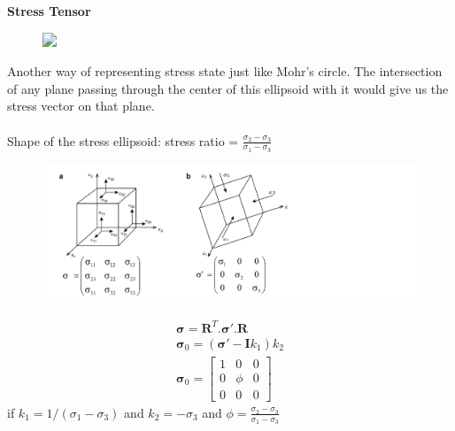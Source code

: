 \documentclass[11pt]{beamer}
\begin{document}
\begin{frame}{\textbf{Stress Tensor}}
    \begin{figure}
        \includegraphics<1->[width=0.7\linewidth]{images/stressellipse}
    \end{figure}

    \pause%
    
    Another way of representing stress state just like Mohr's circle. The intersection of any plane passing through the center of this ellipsoid with it would give us the stress vector on that plane.
    \\~\\
    Shape of the stress ellipsoid: stress ratio = $\frac{\sigma_2 - \sigma_3}{\sigma_1 - \sigma_3}$
\end{frame}

\begin{frame}
    \begin{figure}[!htb]
        \centering
        \includegraphics[width=1\linewidth]{images/obliquestress}
    \end{figure}
    \pause%
    \begin{align*}
        \mathbf{\sigma} = \mathbf{R}^T.\mathbf{\sigma'}.\mathbf{R} \\
        \mathbf{\sigma}_0 = (\mathbf{\sigma'} - \mathbf{I}k_1)k_2 \\
        \mathbf{\sigma}_0 = 
        \begin{bmatrix}
            1 & 0 & 0 \\
            0 & \phi & 0 \\
            0 & 0 & 0
        \end{bmatrix}
    \end{align*}
    if $k_1 = 1/(\sigma_1 - \sigma_3)$ and $k_2 = -\sigma_3$ and $\phi = \frac{\sigma_2 - \sigma_3}{\sigma_1 - \sigma_3}$

\end{frame}
\end{document}
